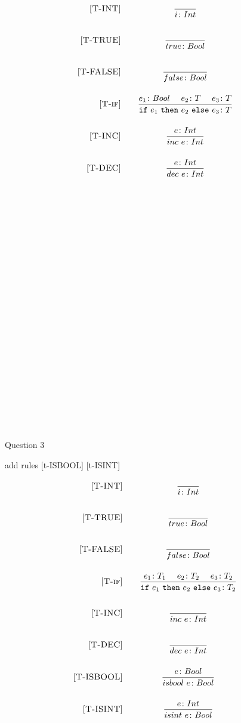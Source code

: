 \documentclass[addpoinT]{exam}
\begin{document}
\[
  \begin{array}{r@{\qquad}c}
    \ssrule{T-INT}{
    }{
        \Ttep{i}{Int}
    }
    \ssrule{T-TRUE}{
    }{
        \Ttep{true}{Bool}
    }
    \ssrule{T-FALSE}{
    }{
        \Ttep{false}{Bool}
    }
    \ssrule{T-if}{
        \Ttep{e_1}{Bool} ~~~~
        \Ttep{e_2}{T} ~~~~
        \Ttep{e_3}{T}
    }{
        \Ttep{\ife{e_1}{e_2}{e_3}}{T}
    }
    \ssrule{T-INC}{
        \Ttep{e}{Int}
    }{
        \Ttep{inc~e}{Int}
    }
    \ssrule{T-DEC}{
        \Ttep{e}{Int}
    }{
        \Ttep{dec~e}{Int}
    }
    \\ \\ \\ \\ \\ \\ \\ \\ \\ \\ \\ \\ \\ \\ \\ \\ \\ \\ \\ \\ \\ \\ \\ \\
  \end{array}
\]

Question 3 

add rules [t-ISBOOL] [t-ISINT]
\[
  \begin{array}{r@{\qquad}c}
    \ssrule{T-INT}{
    }{
        \Ttep{i}{Int}
    }
    \ssrule{T-TRUE}{
    }{
        \Ttep{true}{Bool}
    }
    \ssrule{T-FALSE}{
    }{
        \Ttep{false}{Bool}
    }
    \ssrule{T-if}{
        \Ttep{e_1}{T_1} ~~~~
        \Ttep{e_2}{T_2} ~~~~
        \Ttep{e_3}{T_2}
    }{
        \Ttep{\ife{e_1}{e_2}{e_3}}{T_2}
    }
    \ssrule{T-INC}{
    }{
        \Ttep{inc~e}{Int}
    }
    \ssrule{T-DEC}{
    }{
        \Ttep{dec~e}{Int}
    }
    \ssrule{T-ISBOOL}{
        \Ttep{e}{Bool}
    }{
        \Ttep{isbool~e}{Bool}
    }
    \ssrule{T-ISINT}{
        \Ttep{e}{Int}
    }{
        \Ttep{isint~e}{Bool}
    }
  \end{array}
\]
\end{document}
